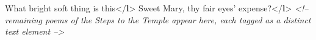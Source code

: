 \begin{shaded}
\hspace*{1em}\hspace*{1em}\hspace*{1em}\hspace*{1em}\hspace*{1em}\mbox{}\newline 
\hspace*{1em}\hspace*{1em}\hspace*{1em}\hspace*{1em}\hspace*{1em}\hspace*{1em}What bright soft thing is this{</\textbf{l}>}\mbox{}\newline 
\hspace*{1em}\hspace*{1em}\hspace*{1em}\hspace*{1em}\hspace*{1em}\hspace*{1em}Sweet Mary, thy fair eyes' expense?{</\textbf{l}>}\mbox{}\newline 
\hspace*{1em}\hspace*{1em}\hspace*{1em}\hspace*{1em}\hspace*{1em}\mbox{}\newline 
\hspace*{1em}\hspace*{1em}\hspace*{1em}\hspace*{1em}\mbox{}\newline 
\hspace*{1em}\hspace*{1em}\hspace*{1em}\mbox{}\newline 
\textit{<!-- remaining poems of the Steps to the Temple appear\newline
	    here, each tagged as a distinct text element -->}\mbox{}\newline 

\end{shaded}
